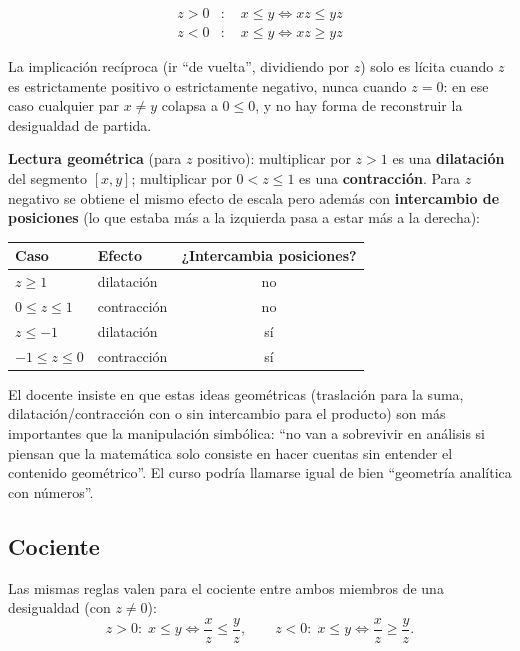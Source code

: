 \documentclass[12pt,a4paper]{article}
\begin{document}
$$
\boxed{
\begin{aligned}
z>0 &: \quad x \leq y \iff xz \leq yz \\
z<0 &: \quad x \leq y \iff xz \geq yz
\end{aligned}}
$$

La implicación recíproca (ir ``de vuelta'', dividiendo por $z$) solo es
lícita cuando $z$ es estrictamente positivo o estrictamente negativo, nunca
cuando $z=0$: en ese caso cualquier par $x \ne y$ colapsa a $0 \leq 0$, y no
hay forma de reconstruir la desigualdad de partida.

\textbf{Lectura geométrica} (para $z$ positivo): multiplicar por $z>1$ es
una \textbf{dilatación} del segmento $[x,y]$; multiplicar por $0<z\leq 1$
es una \textbf{contracción}. Para $z$ negativo se obtiene el mismo efecto
de escala pero además con \textbf{intercambio de posiciones} (lo que estaba
más a la izquierda pasa a estar más a la derecha):

\begin{table}[H]
\centering
\begin{tabular}{@{}llc@{}}
\toprule
Caso & Efecto & ¿Intercambia posiciones? \\
\midrule
$z \geq 1$ & dilatación & no \\
$0 \leq z \leq 1$ & contracción & no \\
$z \leq -1$ & dilatación & sí \\
$-1 \leq z \leq 0$ & contracción & sí \\
\bottomrule
\end{tabular}
\end{table}



\begin{notebox}
El docente insiste en que estas ideas geométricas (traslación para la suma,
dilatación/contracción con o sin intercambio para el producto) son más
importantes que la manipulación simbólica: ``no van a sobrevivir en
análisis si piensan que la matemática solo consiste en hacer cuentas sin
entender el contenido geométrico''. El curso podría llamarse igual de bien
``geometría analítica con números''.
\end{notebox}

\subsection{Cociente}

Las mismas reglas valen para el cociente entre ambos miembros de una
desigualdad (con $z \ne 0$):
$$
z>0: \; x \leq y \iff \frac{x}{z} \leq \frac{y}{z}, \qquad
z<0: \; x \leq y \iff \frac{x}{z} \geq \frac{y}{z}.
$$
\end{document}
